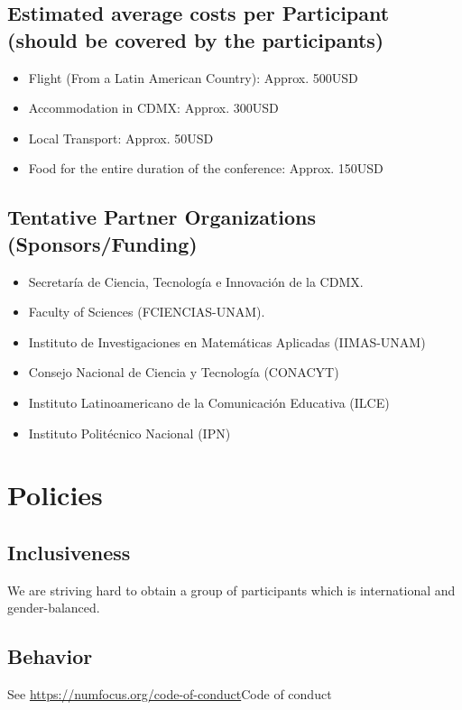 \documentclass{article}[11pt]
\begin{document}
\subsection*{Estimated average costs per Participant (should be covered by the participants)}
\begin{itemize}
  \item Flight (From a Latin American Country): Approx. 500USD
  \item Accommodation in CDMX: Approx. 300USD
  \item Local Transport: Approx. 50USD
  \item Food for the entire duration of the conference: Approx. 150USD
\end{itemize}

\subsection*{Tentative Partner Organizations (Sponsors/Funding)}
\begin{itemize}
    \item Secretar\'ia de Ciencia, Tecnolog\'ia e Innovaci\'on de la CDMX.
    \item Faculty of Sciences (FCIENCIAS-UNAM).
    \item Instituto de Investigaciones en Matem\'aticas Aplicadas (IIMAS-UNAM)
    \item Consejo Nacional de Ciencia y Tecnolog\'ia (CONACYT)
    \item Instituto Latinoamericano de la Comunicaci\'on Educativa (ILCE)
    \item Instituto Polit\'ecnico Nacional (IPN)
\end{itemize}

\section*{Policies}

\subsection*{Inclusiveness}
 We are striving hard to obtain a group of participants which is international and gender-balanced.

\subsection*{Behavior}
See \url{https://numfocus.org/code-of-conduct}{Code of conduct}

\subsection*{}
\end{document}
